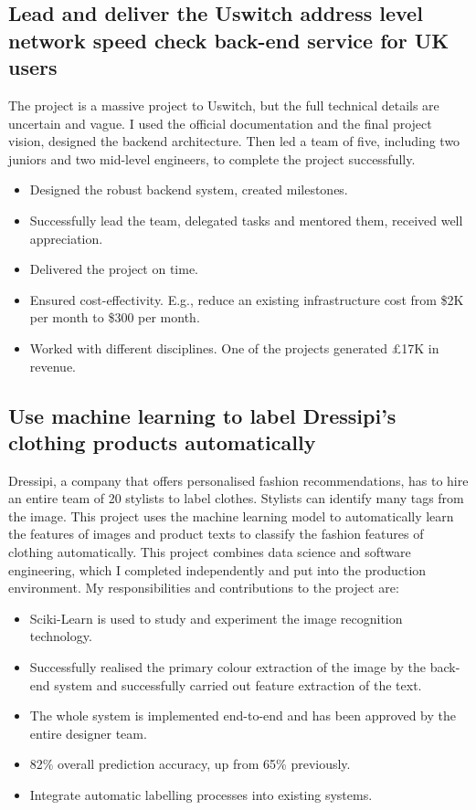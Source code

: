 \documentclass[a4paper]{twentysecondcv-english} %
\begin{document}
\subsection{Lead and deliver the Uswitch address level network speed check back-end service for UK users}

The project is a massive project to Uswitch, but the full technical details are uncertain and vague. I used the official documentation and the final project vision, designed the backend architecture. Then led a team of five, including two juniors and two mid-level engineers, to complete the project successfully.

\begin{itemize}
    \item Designed the robust backend system, created milestones.
    \item Successfully lead the team, delegated tasks and mentored them, received well appreciation.
    \item Delivered the project on time.
    \item Ensured cost-effectivity. E.g., reduce an existing infrastructure cost from \$2K per month to \$300 per month.
    \item Worked with different disciplines. One of the projects generated £17K in revenue.
\end{itemize}

\newpage %
\makesidebar

\subsection{Use machine learning to label Dressipi's clothing products automatically}

Dressipi, a company that offers personalised fashion recommendations, has to hire an entire team of 20 stylists to label clothes. Stylists can identify many tags from the image. This project uses the machine learning model to automatically learn the features of images and product texts to classify the fashion features of clothing automatically. This project combines data science and software engineering, which I completed independently and put into the production environment. My responsibilities and contributions to the project are:
\begin{itemize}
    \item Sciki-Learn is used to study and experiment the image recognition technology.
    \item Successfully realised the primary colour extraction of the image by the back-end system and successfully carried out feature extraction of the text.
    \item The whole system is implemented end-to-end and has been approved by the entire designer team.
    \item 82\% overall prediction accuracy, up from 65\% previously.
    \item Integrate automatic labelling processes into existing systems.
\end{itemize}
\end{document}
